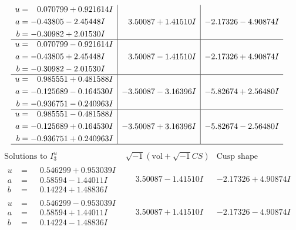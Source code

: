 \documentclass[1p]{elsarticle_modified}
\theoremstyle{definition}
\newcommand{\I}{\sqrt{-1}}
\begin{document}
$$\begin{array}{c|c|c}
\begin{aligned}
u &= \phantom{-}0.070799 + 0.921614 I \\
a &= -0.43805 - 2.45448 I \\
b &= -0.30982 + 2.01530 I\end{aligned}
 & \phantom{-}3.50087 + 1.41510 I & -2.17326 - 4.90874 I \\ \hline\begin{aligned}
u &= \phantom{-}0.070799 - 0.921614 I \\
a &= -0.43805 + 2.45448 I \\
b &= -0.30982 - 2.01530 I\end{aligned}
 & \phantom{-}3.50087 - 1.41510 I & -2.17326 + 4.90874 I \\ \hline\begin{aligned}
u &= \phantom{-}0.985551 + 0.481588 I \\
a &= -0.125689 - 0.164530 I \\
b &= -0.936751 - 0.240963 I\end{aligned}
 & -3.50087 - 3.16396 I & -5.82674 + 2.56480 I \\ \hline\begin{aligned}
u &= \phantom{-}0.985551 - 0.481588 I \\
a &= -0.125689 + 0.164530 I \\
b &= -0.936751 + 0.240963 I\end{aligned}
 & -3.50087 + 3.16396 I & -5.82674 - 2.56480 I\\
 \hline 
 \end{array}$$\newpage$$\begin{array}{c|c|c}  
\text{Solutions to }I^u_{3}& \I (\text{vol} + \sqrt{-1}CS) & \text{Cusp shape}\\
 \hline 
\begin{aligned}
u &= \phantom{-}0.546299 + 0.953039 I \\
a &= \phantom{-}0.58594 - 1.44011 I \\
b &= \phantom{-}0.14224 + 1.48836 I\end{aligned}
 & \phantom{-}3.50087 - 1.41510 I & -2.17326 + 4.90874 I \\ \hline\begin{aligned}
u &= \phantom{-}0.546299 - 0.953039 I \\
a &= \phantom{-}0.58594 + 1.44011 I \\
b &= \phantom{-}0.14224 - 1.48836 I\end{aligned}
 & \phantom{-}3.50087 + 1.41510 I & -2.17326 - 4.90874 I \\ \hline\begin{aligned}

\end{aligned}
\end{array}$$
\end{document}
